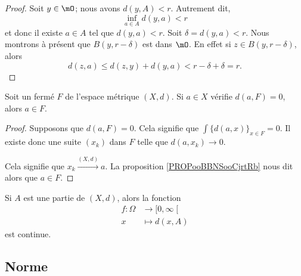 \begin{proof}
   Soit \( y\in \mO\); nous avons \( d(y,A)<r\). Autrement dit,
   \begin{equation}
       \inf_{a\in A}d(y,a)<r
   \end{equation}
   et donc il existe \( a\in A\) tel que \( d(y,a)<r\). Soit \( \delta=d(y,a)<r\). Nous montrons à présent que \( B(y,r-\delta)\) est dans \( \mO\). En effet si \( z\in B(y,r-\delta)\), alors
   \begin{equation}
       d(z,a)\leq d(z,y)+d(y,a)<r-\delta+\delta=r.
   \end{equation}
\end{proof}

\begin{lemma}        \label{LEMooEQIZooLpsbOe}
   Soit un fermé \( F\) de l'espace métrique \( (X,d)\). Si \( a\in X\) vérifie \( d(a,F)=0\), alors \( a\in F\).
\end{lemma}

\begin{proof}
    Supposons que \( d(a,F)=0\). Cela signifie que \( \int\{ d(a,x) \}_{x\in F}=0\). Il existe donc une suite \( (x_k)\) dans \( F\) telle que \( d(a,x_k)\to 0\).

    Cela signifie que \( x_k\stackrel{(X,d)}{\longrightarrow}a\). La proposition \ref{PROPooBBNSooCjrtRb} nous dit alors que \( a\in F\).
\end{proof}
 

\begin{lemma}        \label{LEMooCFGTooIfdcfk}
    Si \( A\) est une partie de \( (X,d)\), alors la fonction
    \begin{equation}
        \begin{aligned}
            f\colon \Omega&\to \mathopen[ 0 , \infty \mathclose[ \\
            x&\mapsto d(x,A) 
        \end{aligned}
    \end{equation}
    est continue.
\end{lemma}

\subsection{Norme}

